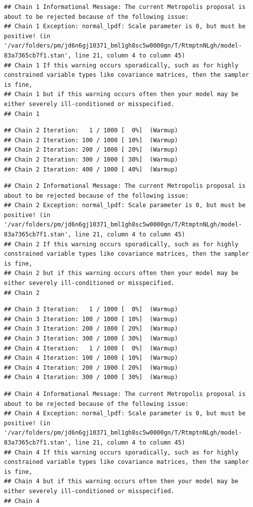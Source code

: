 \documentclass[
]{book}
\begin{document}
\begin{verbatim}
## Chain 1 Informational Message: The current Metropolis proposal is about to be rejected because of the following issue:
## Chain 1 Exception: normal_lpdf: Scale parameter is 0, but must be positive! (in '/var/folders/pm/jd6n6gj10371_bml1gh8sc5w0000gn/T/RtmptnNLgh/model-83a7365cb7f1.stan', line 21, column 4 to column 45)
## Chain 1 If this warning occurs sporadically, such as for highly constrained variable types like covariance matrices, then the sampler is fine,
## Chain 1 but if this warning occurs often then your model may be either severely ill-conditioned or misspecified.
## Chain 1
\end{verbatim}

\begin{verbatim}
## Chain 2 Iteration:   1 / 1000 [  0%]  (Warmup) 
## Chain 2 Iteration: 100 / 1000 [ 10%]  (Warmup) 
## Chain 2 Iteration: 200 / 1000 [ 20%]  (Warmup) 
## Chain 2 Iteration: 300 / 1000 [ 30%]  (Warmup) 
## Chain 2 Iteration: 400 / 1000 [ 40%]  (Warmup)
\end{verbatim}

\begin{verbatim}
## Chain 2 Informational Message: The current Metropolis proposal is about to be rejected because of the following issue:
## Chain 2 Exception: normal_lpdf: Scale parameter is 0, but must be positive! (in '/var/folders/pm/jd6n6gj10371_bml1gh8sc5w0000gn/T/RtmptnNLgh/model-83a7365cb7f1.stan', line 21, column 4 to column 45)
## Chain 2 If this warning occurs sporadically, such as for highly constrained variable types like covariance matrices, then the sampler is fine,
## Chain 2 but if this warning occurs often then your model may be either severely ill-conditioned or misspecified.
## Chain 2
\end{verbatim}

\begin{verbatim}
## Chain 3 Iteration:   1 / 1000 [  0%]  (Warmup) 
## Chain 3 Iteration: 100 / 1000 [ 10%]  (Warmup) 
## Chain 3 Iteration: 200 / 1000 [ 20%]  (Warmup) 
## Chain 3 Iteration: 300 / 1000 [ 30%]  (Warmup) 
## Chain 4 Iteration:   1 / 1000 [  0%]  (Warmup) 
## Chain 4 Iteration: 100 / 1000 [ 10%]  (Warmup) 
## Chain 4 Iteration: 200 / 1000 [ 20%]  (Warmup) 
## Chain 4 Iteration: 300 / 1000 [ 30%]  (Warmup)
\end{verbatim}

\begin{verbatim}
## Chain 4 Informational Message: The current Metropolis proposal is about to be rejected because of the following issue:
## Chain 4 Exception: normal_lpdf: Scale parameter is 0, but must be positive! (in '/var/folders/pm/jd6n6gj10371_bml1gh8sc5w0000gn/T/RtmptnNLgh/model-83a7365cb7f1.stan', line 21, column 4 to column 45)
## Chain 4 If this warning occurs sporadically, such as for highly constrained variable types like covariance matrices, then the sampler is fine,
## Chain 4 but if this warning occurs often then your model may be either severely ill-conditioned or misspecified.
## Chain 4
\end{verbatim}
\end{document}

